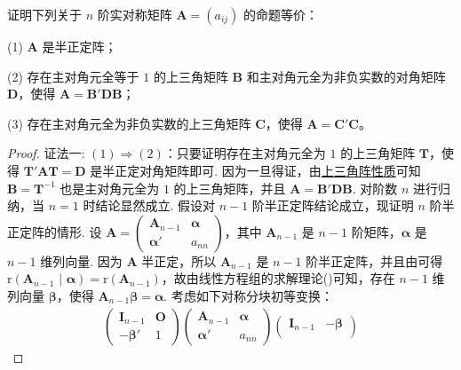 \documentclass[../../main.tex]{subfiles}
\begin{document}
\begin{proposition}\label{proposition:例8.78}
证明下列关于 $n$ 阶实对称矩阵 $\boldsymbol{A}=(a_{ij})$ 的命题等价：

(1) $\boldsymbol{A}$ 是半正定阵；

(2) 存在主对角元全等于 $1$ 的上三角矩阵 $\boldsymbol{B}$ 和主对角元全为非负实数的对角矩阵 $\boldsymbol{D}$，使得 $\boldsymbol{A}=\boldsymbol{B}'\boldsymbol{D}\boldsymbol{B}$；

(3) 存在主对角元全为非负实数的上三角矩阵 $\boldsymbol{C}$，使得 $\boldsymbol{A}=\boldsymbol{C}'\boldsymbol{C}$。
\end{proposition}
\begin{proof}
{\color{blue}证法一:}
$(1)\Rightarrow(2)$：只要证明存在主对角元全为 $1$ 的上三角矩阵 $\boldsymbol{T}$，使得 $\boldsymbol{T}'\boldsymbol{A}\boldsymbol{T}=\boldsymbol{D}$ 是半正定对角矩阵即可. 因为一旦得证，由\hyperref[proposition:上三角阵性质]{上三角阵性质}可知$\boldsymbol{B}=\boldsymbol{T}^{-1}$ 也是主对角元全为 $1$ 的上三角矩阵，并且 $\boldsymbol{A}=\boldsymbol{B}'\boldsymbol{D}\boldsymbol{B}$. 对阶数 $n$ 进行归纳，当 $n = 1$ 时结论显然成立. 假设对 $n - 1$ 阶半正定阵结论成立，现证明 $n$ 阶半正定阵的情形. 设 $\boldsymbol{A}=\begin{pmatrix}
\boldsymbol{A}_{n - 1} & \boldsymbol{\alpha} \\
\boldsymbol{\alpha}' & a_{nn}
\end{pmatrix}$，其中 $\boldsymbol{A}_{n - 1}$ 是 $n - 1$ 阶矩阵，$\boldsymbol{\alpha}$ 是 $n - 1$ 维列向量. 因为 $\boldsymbol{A}$ 半正定，所以 $\boldsymbol{A}_{n - 1}$ 是 $n - 1$ 阶半正定阵，并且由可得 $\mathrm{r}(\boldsymbol{A}_{n - 1}\,\,|\,\,\boldsymbol{\alpha})=\mathrm{r}(\boldsymbol{A}_{n - 1})$，故由线性方程组的求解理论()可知，存在 $n - 1$ 维列向量 $\boldsymbol{\beta}$，使得 $\boldsymbol{A}_{n - 1}\boldsymbol{\beta}=\boldsymbol{\alpha}$. 考虑如下对称分块初等变换：
\begin{align*}
\begin{pmatrix}
\boldsymbol{I}_{n - 1} & \boldsymbol{O} \\
-\boldsymbol{\beta}' & 1
\end{pmatrix}
\begin{pmatrix}
\boldsymbol{A}_{n - 1} & \boldsymbol{\alpha} \\
\boldsymbol{\alpha}' & a_{nn}
\end{pmatrix}
\begin{pmatrix}
\boldsymbol{I}_{n - 1} & -\boldsymbol{\beta} \\

\end{pmatrix}
\end{align*}
\end{proof}
\end{document}
